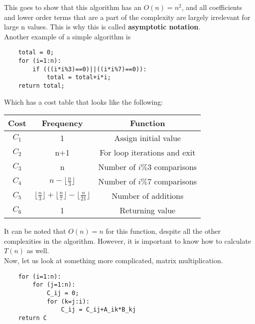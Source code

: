 \documentclass[nobib]{tufte-handout}
\begin{document}
This goes to show that this algorithm has an $O(n) = n^2$, and all coefficients and lower order terms that are a part of the complexity are largely irrelevant for large n values.
This is why this is called \textbf{asymptotic notation}.\\
Another example of a simple algorithm is
\begin{lstlisting}
    total = 0;
    for (i=1:n):
        if (((i*i%3)==0)||((i*i%7)==0)):
            total = total+i*i;
    return total;
\end{lstlisting}
Which has a cost table that looks like the following:\\
\begin{table}
    \centering
    \begin{tabular}{c|c|c}
        Cost  & Frequency                                                                                  & Function                     \\
        \hline
        $C_1$ & 1                                                                                          & Assign initial value         \\
        $C_2$ & n+1                                                                                        & For loop iterations and exit \\
        $C_3$ & n                                                                                          & Number of $i\%3$ comparisons \\
        $C_4$ & $n - \lfloor \frac{n}{3} \rfloor  $                                                        & Number of $i\%7$ comparisons \\
        $C_5$ & $\lfloor \frac{n}{3} \rfloor + \lfloor \frac{n}{7} \rfloor - \lfloor \frac{n}{21} \rfloor$ & Number of additions          \\
        $C_6$ & 1                                                                                          & Returning value              \\
    \end{tabular}
\end{table}
It can be noted that $O(n) = n$ for this function, despite all the other complexities in the algorithm. However, it is important to know how to calculate $T(n)$ as well.\\
Now, let us look at something more complicated, matrix multiplication.
\begin{lstlisting}
    for (i=1:n):
        for (j=1:n):
            C_ij = 0;
            for (k=j:i):
                C_ij = C_ij+A_ik*B_kj
    return C
\end{lstlisting}
\end{document}
